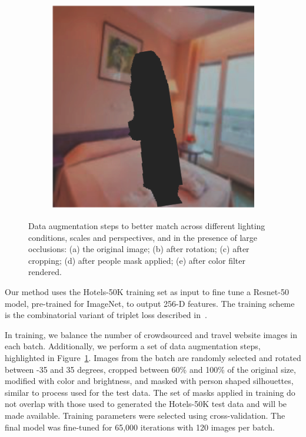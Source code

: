 \begin{figure}
\begin{subfigure}[b]{.19\columnwidth}
        \caption{}
    \end{subfigure}
    \begin{subfigure}[b]{.19\columnwidth}
        \centering
        \includegraphics[width=.98\columnwidth]{figures/chapter5/data_augmentation/5.png}
        \caption{}
    \end{subfigure}
    \caption[Data augmentation to mimic properties of query images.]{Data augmentation steps to better match across different lighting conditions, scales and perspectives, and in the presence of large occlusions: (a) the original image; (b) after rotation; (c) after cropping; (d) after people mask applied; (e) after color filter rendered.}
    \label{fig:data_augmentation}
\end{figure}

Our method uses the Hotels-50K training set as input
to fine tune a Resnet-50 model, pre-trained for ImageNet, to output 256-D features. The training scheme is the  combinatorial variant of triplet loss described in~\cite{HermansBeyer2017Arxiv}.

In training, we balance the number of crowdsourced and travel website images in each batch. Additionally, we perform a set of data augmentation steps, highlighted in Figure~\ref{fig:data_augmentation}. Images from the batch are randomly selected and rotated between -35 and 35 degrees, cropped between 60\% and 100\% of the original size, modified with color and brightness, and masked with person shaped silhouettes, similar to process used for the test data. The set of masks applied in training do not overlap with those used to generated the Hotels-50K test data and will be made available. Training parameters
were selected using cross-validation. The final model
was fine-tuned for 65,000 iterations with 120 images per batch.

